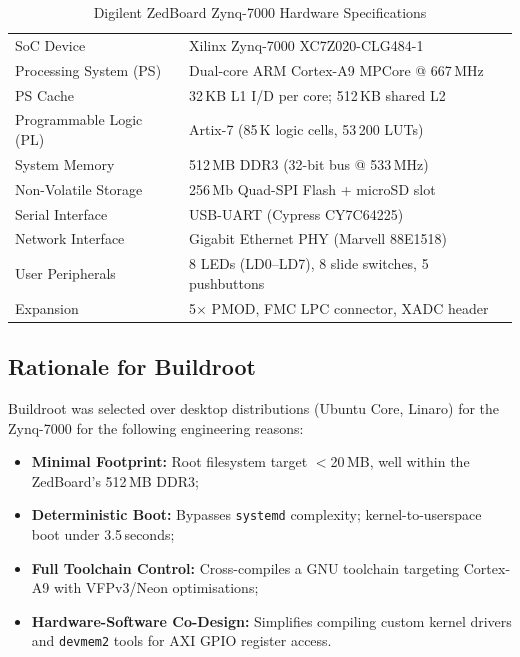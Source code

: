 \documentclass[12pt,a4paper]{article}
\begin{document}
\renewcommand{\arraystretch}{1.30}
\begin{table}[H]
\centering
\caption{Digilent ZedBoard Zynq-7000 Hardware Specifications}
\label{tab:zedboard_specs}
\small
\begin{tabularx}{\linewidth}{@{} L{4.5cm} X @{}}
\toprule
{} &  \\
\midrule
{}
SoC Device             & Xilinx Zynq-7000 XC7Z020-CLG484-1 \\
Processing System (PS) & Dual-core ARM Cortex-A9 MPCore @ 667\,MHz \\
PS Cache               & 32\,KB L1 I/D per core; 512\,KB shared L2 \\
Programmable Logic (PL)& Artix-7 (85\,K logic cells, 53\,200 LUTs) \\
System Memory          & 512\,MB DDR3 (32-bit bus @ 533\,MHz) \\
Non-Volatile Storage   & 256\,Mb Quad-SPI Flash + microSD slot \\
Serial Interface       & USB-UART (Cypress CY7C64225) \\
Network Interface      & Gigabit Ethernet PHY (Marvell 88E1518) \\
User Peripherals       & 8 LEDs (LD0--LD7), 8 slide switches, 5 pushbuttons \\
Expansion              & 5$\times$ PMOD, FMC LPC connector, XADC header \\
\bottomrule
\end{tabularx}
\end{table}

\subsection{Rationale for Buildroot}

\begin{successbox}
Buildroot was selected over desktop distributions (Ubuntu Core, Linaro) for the
Zynq-7000 for the following engineering reasons:
\begin{itemize}
  \item \textbf{Minimal Footprint:} Root filesystem target $<$20\,MB, well within the
  ZedBoard's 512\,MB DDR3;
  \item \textbf{Deterministic Boot:} Bypasses \texttt{systemd} complexity;
  kernel-to-userspace boot under 3.5\,seconds;
  \item \textbf{Full Toolchain Control:} Cross-compiles a GNU toolchain targeting
  Cortex-A9 with VFPv3/Neon optimisations;
  \item \textbf{Hardware-Software Co-Design:} Simplifies compiling custom kernel drivers
  and \texttt{devmem2} tools for AXI GPIO register access.
\end{itemize}
\end{successbox}
\end{document}
